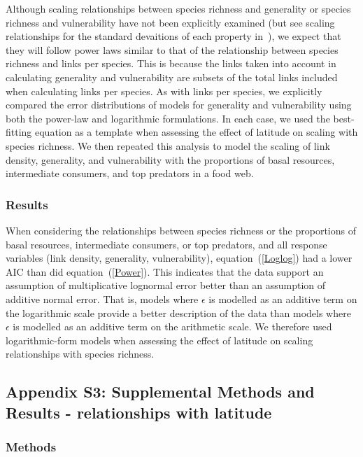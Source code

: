 \documentclass[12pt]{article}
\begin{document}
    Although scaling relationships between species richness and generality or
    species richness and vulnerability have not been explicitly examined (but see scaling 
    relationships for the standard devaitions of each property in~\citet{Riede2010}), we expect that they will follow
    power laws similar to that of the relationship between species richness and links per species.
    This is because the links taken into account in calculating generality and vulnerability are subsets 
    of the total links included when calculating links per species. As with links per species, we explicitly 
    compared the error distributions of models for generality and vulnerability using
    both the power-law and logarithmic formulations. 
    In each case, we used the best-fitting equation as a template when assessing the effect of latitude on scaling with
    species richness. We then repeated this analysis 
    to model the scaling of link density, generality, 
    and vulnerability with the proportions of basal 
    resources, intermediate consumers, and top predators
    in a food web.


  \subsubsection*{Results}

    When considering the relationships between species richness or the proportions 
    of basal resources, intermediate consumers, or top predators, and all response variables 
    (link density, generality, vulnerability), equation~(\ref{Loglog}) had a
    lower AIC than did equation~(\ref{Power}). This indicates that the
    data support an assumption of multiplicative lognormal error better than an
    assumption of additive normal error. That is, models where $\epsilon$ is
    modelled as an additive term on
    the logarithmic scale provide a better description of the data than models
    where $\epsilon$ is modelled as an additive term on the arithmetic scale.  
    We therefore used logarithmic-form models when assessing the
    effect of latitude on scaling relationships  with species richness.

\subsection*{Appendix S3: Supplemental Methods and Results - relationships with latitude}

  \subsubsection*{Methods}
\end{document}

